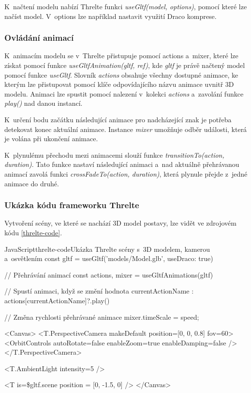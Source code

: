 \documentclass[
  master,
  program=ainfvs,
  biblatex,
  figures=true,
  tables=false,
  sourcecodes=true,
  glossaries,
  index
]{kidiplom}
\begin{document}
            K~načtení modelu nabízí Threlte funkci \emph{useGltf(model, options)}, pomocí které lze načíst model. V~options lze například nastavit využití Draco komprese.


        \subsubsection{Ovládání animací} \label{ovladani-animaci}
            K~animacím modelu se v~Threlte přistupuje pomocí actions a~mixer, které lze získat pomocí funkce \emph{useGltfAnimation(gltf, ref)}, kde \emph{gltf} je právě načtený model pomocí funkce \emph{useGltf}. Slovník \emph{actions} obsahuje všechny dostupné animace, ke kterým lze přistupovat pomocí klíče odpovídajícího názvu animace uvnitř 3D modelu. Animaci lze spustit pomocí nalezení v~kolekci \emph{actions} a~zavolání funkce \emph{play()} nad danou instancí.

            K~určení bodu začátku následující animace pro nadcházející znak je potřeba detekovat konec aktuální animace. Instance \emph{mixer} umožňuje odběr události, která je volána při ukončení animace.

            K~plynulému přechodu mezi animacemi slouží funkce \emph{transitionTo(action, duration)}. Tato funkce nastaví následující animaci a~nad aktuálně přehrávanou animací zavolá funkci \emph{crossFadeTo(action, duration)}, která plynule přejde z~jedné animace do druhé.


        \subsubsection{Ukázka kódu frameworku Threlte}
            Vytvoření scény, ve které se nachází 3D model postavy, lze vidět ve zdrojovém kódu \ref{threlte-code}.

            \begin{kicode}{JavaScript}{threlte-code}{Ukázka Threlte scény s~3D modelem, kamerou a~osvětlením}
const gltf = useGltf('models/Model.glb', {useDraco: true})

// Přehrávání animací
const { actions, mixer } = useGltfAnimations(gltf)

// Spustí animaci, když se změní hodnota currentActionName
$: $actions[currentActionName]?.play()

// Změna rychlosti přehrávané animace
mixer.timeScale = speed;

<Canvas>
    <T.PerspectiveCamera makeDefault position={[0, 0, 0.8]} fov={60}>
        <OrbitControls autoRotate={false} enableZoom={true} enableDamping={false} />
    </T.PerspectiveCamera>

    <T.AmbientLight intensity={5} />

    <T is={\$gltf.scene} position = {[0, -1.5, 0]} />
</Canvas>
            \end{kicode}
\end{document}

